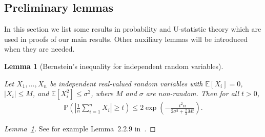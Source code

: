 \documentclass[11pt,lof]{puthesis}
\renewcommand{\P}{\ensuremath{\mathbb{P}}}
\newcommand{\E}{\ensuremath{\mathbb{E}}}
\theoremstyle{break}
\newtheorem{lemma}{Lemma}[section]
\theoremstyle{proof}
\newtheorem{proof}{Proof}
\begin{document}
\subsection{Preliminary lemmas}

In this section we list some results
in probability and U-statistic theory
which are used in proofs of our main results.
Other auxiliary lemmas will be introduced when
they are needed.

\begin{lemma}[Bernstein's inequality for independent random variables]
  \label{lem:kernel_app_bernstein}

  Let $X_1, \ldots, X_n$ be independent real-valued
  random variables with
  $\E[X_i] = 0$, $|X_i| \leq M$, and
  $\E[X_i^2] \leq \sigma^2$,
  where $M$ and $\sigma$ are non-random.
  Then for all $t>0$,
  \begin{align*}
    \P \left(
      \left| \frac{1}{n} \sum_{i=1}^n X_i \right| \geq t
    \right)
    \leq 2 \exp \left( -
      \frac{t^2 n}
      {2 \sigma^2 + \frac{2}{3} M t}
    \right).
  \end{align*}

\end{lemma}

\begin{proof}[Lemma~\ref{lem:kernel_app_bernstein}]

  See for example
  Lemma~2.2.9 in~\citet{van1996weak}.
\end{proof}
\end{document}
